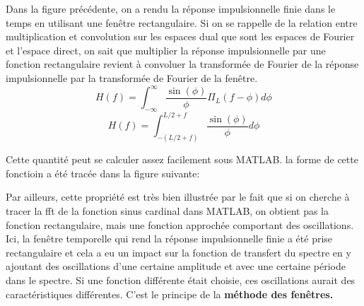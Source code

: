 \documentclass[11pt,a4paper]{article}
\begin{document}
Dans la figure précédente, on a rendu la réponse impulsionnelle finie dans le temps en utilisant une fenêtre rectangulaire. Si on se rappelle de la relation entre multiplication et convolution sur les espaces dual que sont les espaces de Fourier et l'espace direct, on sait que multiplier la réponse impulsionnelle par une fonction rectangulaire revient à convoluer la transformée de Fourier de la réponse impulsionnelle par la transformée de Fourier de la fenêtre.\\

\[ H(f) =  \int^{\infty}_{-\infty} \frac{\sin(\phi)}{\phi } \Pi_L(f- \phi) d \phi \]
\[ H(f) =  \int^{L/2+f}_{-(L/2+ f)} \frac{\sin(\phi)}{\phi }  d \phi \]

Cette quantité peut se calculer assez facilement sous MATLAB. la forme de cette fonctioin a été tracée dans la figure suivante:\\ %


\usetikzlibrary {datavisualization}

%


Par ailleurs, cette propriété est très bien illustrée par le fait que si on cherche à tracer la fft de la fonction sinus cardinal dans MATLAB, on obtient pas la fonction rectangulaire, mais une fonction approchée comportant des oscillations.\\

Ici, la fenêtre temporelle qui rend la réponse impulsionnelle finie a été prise rectangulaire et cela a eu un impact sur la fonction de transfert du spectre en y ajoutant des oscillations d'une certaine amplitude et avec une certaine période dans le spectre. Si une fonction différente était choisie, ces oscillations aurait des caractéristiques différentes. C'est le principe de la \textbf{méthode des fenêtres.}\\
\end{document}
